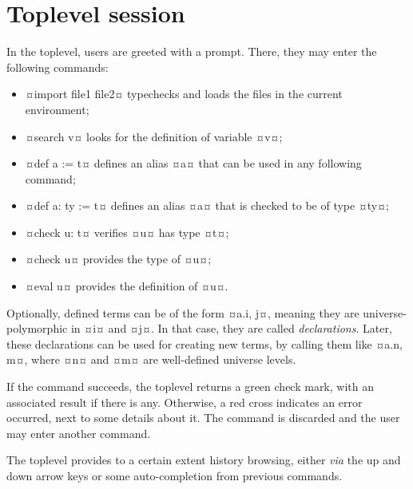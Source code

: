 \documentclass[twocolumn]{article}
\begin{document}
\section{Toplevel session}
In the toplevel, users are greeted with a prompt. There, they may enter the
following commands:
\begin{itemize}
	\item ¤import file1 file2¤ typechecks
		and loads the files in the current environment;
	\item ¤search v¤ looks for the definition of variable ¤v¤;
	\item ¤def a := t¤
		defines an alias ¤a¤ that can be used in any following command;
	\item ¤def a: ty := t¤ defines an alias ¤a¤ that is checked to
		be of type ¤ty¤;
	\item ¤check u: t¤ verifies ¤u¤ has type ¤t¤;
  \item ¤check u¤ provides the type of ¤u¤;
  \item ¤eval u¤ provides the definition of ¤u¤.
\end{itemize}

Optionally, defined terms can be of the form ¤a.{i, j}¤, meaning they are
universe-polymorphic in ¤i¤ and ¤j¤. In that case, they are called
\emph{declarations}. Later, these declarations can be used for creating new
terms, by calling them like ¤a.{n, m}¤, where ¤n¤ and ¤m¤ are well-defined
universe levels.

If the command succeeds, the toplevel returns a green check mark, with an
associated result if there is any. Otherwise, a red cross indicates an error
occurred, next to some details about it. The command is discarded and the user
may enter another command.

The toplevel provides to a certain extent history browsing, either \emph{via}
the up and down arrow keys or some auto-completion from previous commands.
\end{document}
